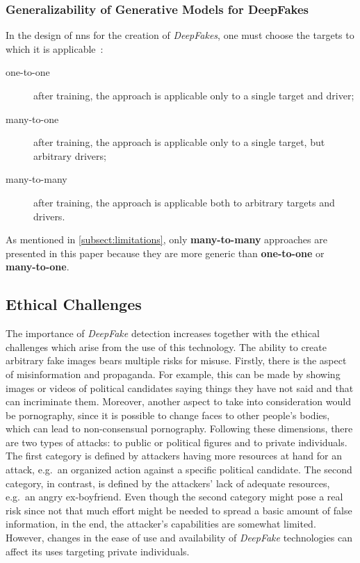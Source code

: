 \subsubsection{Generalizability of Generative Models for DeepFakes}\label{subsubsect:generalizability-deepfakes}
In the design of \glspl{nn} for the creation of \textit{DeepFakes}, one must choose the
targets to which it is applicable~\cite[cf.][]{Mirsky.2020}:
\begin{description}
    \item[one-to-one] after training, the approach is applicable only to a
    single target and driver;
    \item[many-to-one] after training, the approach is applicable only to a
    single target, but arbitrary drivers;
    \item[many-to-many] after training, the approach is applicable both to
    arbitrary targets and drivers.
\end{description}
As mentioned in \cref{subsect:limitations}, only \textbf{many-to-many} approaches
are presented in this paper because they are more generic than \textbf{one-to-one} or
\textbf{many-to-one}.

\subsection{Ethical Challenges}
The importance of \textit{DeepFake} detection increases together with the ethical
challenges which arise from the use of this technology. The ability to create
arbitrary fake images bears multiple risks for misuse. Firstly, there is the
aspect of misinformation and propaganda. For example, this can be made by showing images or videos
of political candidates saying things they have not said and that can incriminate
them. Moreover, another aspect to take into consideration would be pornography,
since it is possible to change faces to other people's bodies, which can lead to
non-consensual pornography. Following these dimensions, there are two types of attacks: to public or political figures and to private individuals. The first category
is defined by attackers having more resources at hand for an attack, e.g.\ an
organized action against a specific political candidate. The second category, in 
contrast, is defined by the attackers' lack of adequate resources, e.g.\ an angry 
ex-boyfriend. Even though the second category might pose a real risk since not 
that much effort might be needed to spread a basic amount of false information, in the 
end, the attacker's capabilities are somewhat limited. However, changes in the ease of use and 
availability of \textit{DeepFake} technologies can affect its uses targeting private individuals.